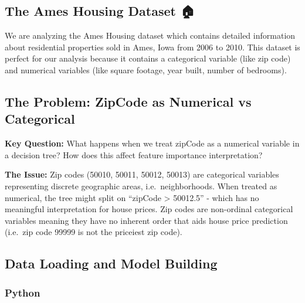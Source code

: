 \documentclass[
  letterpaper,
  DIV=11,
  numbers=noendperiod]{scrartcl}
\begin{document}
\subsection{The Ames Housing Dataset 🏠}\label{the-ames-housing-dataset}

We are analyzing the Ames Housing dataset which contains detailed
information about residential properties sold in Ames, Iowa from 2006 to
2010. This dataset is perfect for our analysis because it contains a
categorical variable (like zip code) and numerical variables (like
square footage, year built, number of bedrooms).

\subsection{The Problem: ZipCode as Numerical vs
Categorical}\label{the-problem-zipcode-as-numerical-vs-categorical}

\textbf{Key Question:} What happens when we treat zipCode as a numerical
variable in a decision tree? How does this affect feature importance
interpretation?

\textbf{The Issue:} Zip codes (50010, 50011, 50012, 50013) are
categorical variables representing discrete geographic areas,
i.e.~neighborhoods. When treated as numerical, the tree might split on
``zipCode \textgreater{} 50012.5'' - which has no meaningful
interpretation for house prices. Zip codes are non-ordinal categorical
variables meaning they have no inherent order that aids house price
prediction (i.e.~zip code 99999 is not the priceiest zip code).

\subsection{Data Loading and Model
Building}\label{data-loading-and-model-building}

\subsubsection{Python}\label{python}
\end{document}
